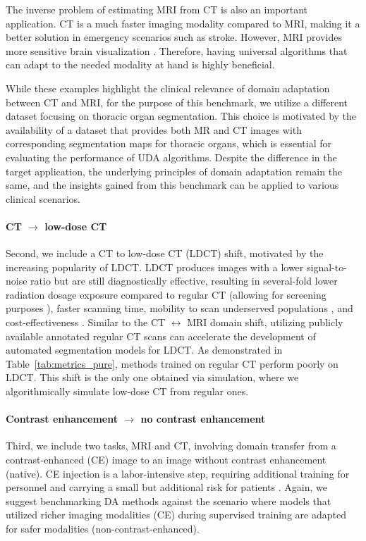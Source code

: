 The inverse problem of estimating MRI from CT is also an important application. CT is a much faster imaging modality compared to MRI, making it a better solution in emergency scenarios such as stroke. However, MRI provides more sensitive brain visualization \cite{vymazal2012comparison}. Therefore, having universal algorithms that can adapt to the needed modality at hand is highly beneficial.

While these examples highlight the clinical relevance of domain adaptation between CT and MRI, for the purpose of this benchmark, we utilize a different dataset focusing on thoracic organ segmentation. This choice is motivated by the availability of a dataset that provides both MR and CT images with corresponding segmentation maps for thoracic organs, which is essential for evaluating the performance of UDA algorithms. Despite the difference in the target application, the underlying principles of domain adaptation remain the same, and the insights gained from this benchmark can be applied to various clinical scenarios.


\paragraph{CT $\rightarrow$ low-dose CT}

Second, we include a CT to low-dose CT (LDCT) shift, motivated by the increasing popularity of LDCT. LDCT produces images with a lower signal-to-noise ratio but are still diagnostically effective, resulting in several-fold lower radiation dosage exposure compared to regular CT (allowing for screening purposes \cite{lidc,kubo2016standard}), faster scanning time, mobility to scan underserved populations \cite{raghavan2020initial}, and cost-effectiveness \cite{mohammadshahi2019cost}. Similar to the CT $\leftrightarrow$ MRI domain shift, utilizing publicly available annotated regular CT scans can accelerate the development of automated segmentation models for LDCT. As demonstrated in Table~\ref{tab:metrics_pure}, methods trained on regular CT perform poorly on LDCT. This shift is the only one obtained via simulation, where we algorithmically simulate low-dose CT from regular ones.


\paragraph{Contrast enhancement $\rightarrow$ no contrast enhancement}

Third, we include two tasks, MRI and CT, involving domain transfer from a contrast-enhanced (CE) image to an image without contrast enhancement (native). CE injection is a labor-intensive step, requiring additional training for personnel and carrying a small but additional risk for patients \cite{andreucci2014side,costelloe2020risks}. Again, we suggest benchmarking DA methods against the scenario where models that utilized richer imaging modalities (CE) during supervised training are adapted for safer modalities (non-contrast-enhanced).


